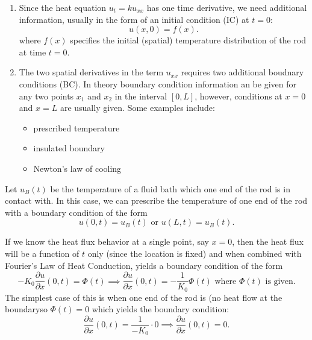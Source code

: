 \documentclass[class=article,crop=false]{standalone}
\begin{document}
\begin{defn}
\begin{enumerate}[label=\arabic*)]
	\item Since the heat equation $ u_t = k u_{x x}$ has one time derivative, we need additional information, usually in the form of an initial condition (IC) at $ t=0$:
		 \[
			 u(x,0)=f(x)
		.\] 
		where $ f(x)$ specifies the initial (spatial) temperature distribution of the rod at time  $ t=0$.
	\item The two spatial derivatives in the term  $ u_{x x}$ requires two additional boudnary conditions (BC). In theory boundary condition information an be given for any two points $ x_1$ and $ x_2$ in the interval $ [0,L]$, however, conditions at  $ x=0$ and  $ x=L$ are usually given. Some examples include:
		 \begin{itemize}
			\item prescribed temperature
			\item insulated boundary
			\item Newton's law of cooling
		\end{itemize}
\end{enumerate}
\end{defn}

\begin{eg}
	Let $ u_B(t)$ be the temperature of a fluid bath which one end of the rod is in contact with. In this case, we can prescribe the temperature of one end of the rod with a boundary condition of the form
	 \[
		 u(0,t)=u_B(t) \text{ or } u(L,t) = u_B(t) 
	.\] 
\end{eg}

\begin{eg}
	If we know the heat flux behavior at a single point, say $ x=0$, then the heat flux will be a function of  $ t$ only (since the location is fixed) and when combined with Fourier's Law of Heat Conduction, yields a boundary condition of the form
	 \[
		 -K_0 \frac{\partial u}{\partial x} (0,t) = \Phi(t) \implies \frac{\partial u}{\partial x} (0,t) = -\frac{1}{K_0}\Phi(t) \text{ where } \Phi(t) \text{ is given}  
	.\] 
	The simplest case of this is when one end of the rod is  (no heat flow at the boundaryso $ \Phi(t) = 0$ which yields the boundary condition:
	\[
		\frac{\partial u}{\partial x} (0,t) = \frac{1}{-K_0} \cdot  0 \implies \frac{\partial u}{\partial x}(0,t)  = 0
	.\]
\end{eg}
\end{document}
